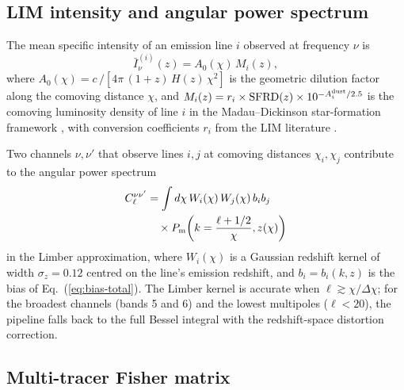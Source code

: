\documentclass[twocolumn,prd,nofootinbib,superscriptaddress,floatfix,11pt]{revtex4-2}
\begin{document}
\subsection{LIM intensity and angular power spectrum}
\label{sec:theory:cell}

The mean specific intensity of an emission line $i$ observed at frequency $\nu$ is
\begin{equation}
\bar{I}_\nu^{(i)}(z) = A_0(\chi)\, M_i(z),
\label{eq:Inu}
\end{equation}
where $A_0(\chi) = c\,/[4\pi\,(1+z)\,H(z)\,\chi^2]$ is the geometric dilution factor along the comoving distance $\chi$, and $M_i(z) = r_i \times {\rm SFRD}(z) \times 10^{-A^{\rm dust}_i/2.5}$ is the comoving luminosity density of line $i$ in the Madau--Dickinson star-formation framework \citep{MadauDickinson2014}, with conversion coefficients $r_i$ from the LIM literature \citep{Cheng2024,Gong2017}.

Two channels $\nu, \nu'$ that observe lines $i, j$ at comoving distances $\chi_i, \chi_j$ contribute to the angular power spectrum
\begin{align}
C_\ell^{\nu\nu'} &= \int d\chi\, W_i(\chi)\, W_j(\chi)\, b_i b_j\, \nonumber\\
& \quad \times P_{\rm m}\!\left(k=\frac{\ell+1/2}{\chi},z(\chi)\right)
\label{eq:cell}
\end{align}
in the Limber approximation, where $W_i(\chi)$ is a Gaussian redshift kernel of width $\sigma_z = 0.12$ centred on the line's emission redshift, and $b_i = b_i(k,z)$ is the bias of Eq.~(\ref{eq:bias-total}).  The Limber kernel is accurate when $\ell \gtrsim \chi/\Delta\chi$; for the broadest channels (bands 5 and 6) and the lowest multipoles ($\ell < 20$), the pipeline falls back to the full Bessel integral with the \citet{Kaiser1987} redshift-space distortion correction.

\subsection{Multi-tracer Fisher matrix}
\label{sec:theory:fisher}
\end{document}
